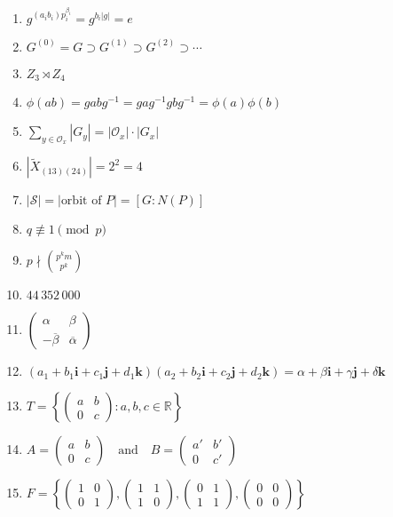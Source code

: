 \documentclass[oneside,10pt,]{article}
\begin{document}
\begin{enumerate}
\item{}\(\displaystyle g^{(a_i b_i ) p_i^{\beta_i}} = g^{b_i |g|} = e\)%
\item{}\(\displaystyle G^{(0)} = G \supset G^{(1)} \supset G^{(2)} \supset \cdots\)%
\item{}\(\displaystyle Z_3\rtimes Z_4\)%
\item{}\(\displaystyle \phi(ab) = gabg^{-1} = gag^{-1} gbg^{-1} = \phi(a) \phi(b)\)%
\item{}\(\displaystyle \sum_{y \in {\mathcal O}_x} |G_y| = | {\mathcal O}_x| \cdot |G_x|\)%
\item{}\(\displaystyle |\widetilde{X}_{(13)(24)}| = 2^2 = 4\)%
\item{}\(\displaystyle |{\mathcal S}| = |\text{orbit of }P| = [G : N(P)]\)%
\item{}\(\displaystyle q \not\equiv 1 \pmod{p}\)%
\item{}\(\displaystyle p \nmid \binom{p^k m}{p^k}\)%
\item{}\(\displaystyle 44\,352\,000\)%
\item{}\(\displaystyle \begin{pmatrix} \alpha & \beta \\ -\overline{\beta} & \overline{\alpha } \end{pmatrix}\)%
\item{}\(\displaystyle (a_1 + b_1 {\mathbf i} + c_1 {\mathbf j} +d_1 {\mathbf k} ) ( a_2 + b_2 {\mathbf i} + c_2 {\mathbf j} +d_2 {\mathbf k} ) = \alpha + \beta {\mathbf i} + \gamma {\mathbf j} + \delta {\mathbf k}\)%
\item{}\(\displaystyle T = \left\{ \begin{pmatrix} a & b \\ 0 & c \end{pmatrix} : a, b, c \in {\mathbb R} \right\}\)%
\item{}\(\displaystyle A = \begin{pmatrix} a & b \\ 0 & c \end{pmatrix} \quad \text{and} \quad B = \begin{pmatrix} a' & b' \\ 0 & c' \end{pmatrix}\)%
\item{}\(\displaystyle F = \left\{ \begin{pmatrix} 1 & 0 \\ 0 & 1 \end{pmatrix}, \begin{pmatrix} 1 & 1 \\ 1 & 0 \end{pmatrix}, \begin{pmatrix} 0 & 1 \\ 1 & 1 \end{pmatrix}, \begin{pmatrix} 0 & 0 \\ 0 & 0 \end{pmatrix} \right\}\)%

\end{enumerate}
\end{document}
